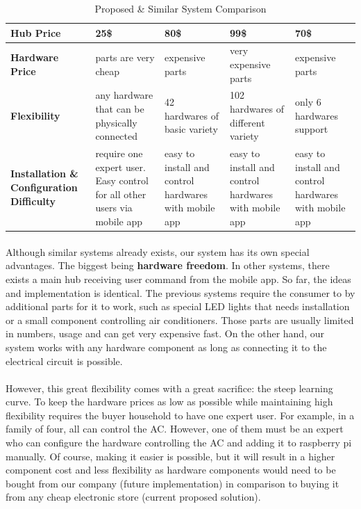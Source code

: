\documentclass[12pt]{paper}
\begin{document}
\begin{table}[H]
\begin{center}
\begin{tabularx}{1\linewidth}{|m{2.2cm}*4{|X}|}
					\\\hline
					
					\textbf{Hub Price} & 25\$ & 80\$ & 99\$ & 70\$ \\\hline
					\textbf{Hardware Price} & parts are very cheap &  expensive parts & very expensive parts & expensive parts \\\hline
					\textbf{Flexibility} & any hardware that can be physically connected & 42 hardwares of basic variety\cite{insteon_p} & 102 hardwares of different variety\cite{wink_p} & only 6 hardwares support \cite{samsung_p} \\\hline
					
					\textbf{Installation \& Configuration Difficulty} & require one expert user. Easy control for all other users via mobile app & easy to install and control hardwares with mobile app  &easy to install and control hardwares with mobile app  & easy to install and control hardwares with mobile app
					\\\hline
				\end{tabularx}
			\end{center}
			\caption{Proposed \& Similar System Comparison}
			\label{table:compare}
		\end{table}
		\label{future}
		\paragraph{} Although similar systems already exists, our system has its own special advantages. The biggest being \textbf{hardware freedom}. In other systems, there exists a main hub receiving user command from the mobile app. So far, the ideas and implementation is identical. The previous systems require the consumer to by additional parts for it to work, such as special LED lights that needs installation or a small component controlling air conditioners. Those parts are usually limited in numbers, usage and can get very expensive fast. On the other hand, our system works with any hardware component as long as connecting it to the electrical circuit is possible.
		\paragraph{} However, this great flexibility comes with a great sacrifice: the steep learning curve. To keep the hardware prices as low as possible while maintaining high flexibility requires the buyer household to have one expert user. For example, in a family of four, all can control the AC. However, one of them must be an expert who can configure the hardware controlling the AC and adding it to raspberry pi manually. Of course, making it easier is possible, but it will result in a higher component cost and less flexibility as hardware components would need to be bought from our company (future implementation) in comparison to buying it from any cheap electronic store (current proposed solution).
\end{document}
